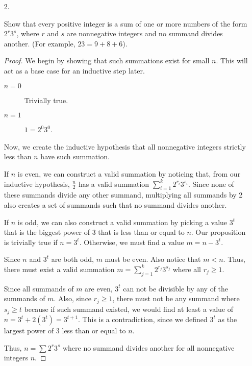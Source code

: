 \documentclass{article}
\begin{document}
\begin{enumerate}
    \item[2.] {
        Show that every positive integer is a sum of one or more numbers of the 
        form \(2^r3^s\), where \(r\) and \(s\) are nonnegative integers and no 
        summand divides another. (For example, \(23 = 9 + 8 + 6\)).

        \begin{proof}
            We begin by showing that such summations exist for small \(n\). This 
            will act as a base case for an inductive step later.

            \begin{description}
                \item[\(n=0\)] Trivially true.
                \item[\(n=1\)] \(1 = 2^0 3^0\).
            \end{description}

            Now, we create the inductive hypothesis that all nonnegative 
            integers strictly less than \(n\) have such summation.

            If \(n\) is even, we can construct a valid summation by noticing 
            that, from our inductive hypothesis, \(\frac{n}{2}\) has a valid summation 
            \(\sum_{i=1}^{k}2^{r_i}3^{s_i}\). Since none of these summands divide 
            any other summand, multiplying all summands by 2 also creates a set 
            of summands such that no summand divides another.

            If \(n\) is odd, we can also construct a valid summation by picking 
            a value \(3^t\) that is the biggest power of 3 that is less than or 
            equal to \(n\). Our proposition is trivially true if \(n = 3^t\). 
            Otherwise, we must find a value \(m = n - 3^t\).

            Since \(n\) and \(3^t\) are both odd, \(m\) must be even. Also notice 
            that \(m < n\). Thus, there must exist a valid summation
            \(m = \sum_{j=1}^{k}2^{r_j}3^{s_j}\) where all \(r_j \ge 1\).

            Since all summands of \(m\) are even, \(3^t\) can not be divisible 
            by any of the summands of \(m\). Also, since \(r_j \ge 1\), there 
            must not be any summand where \(s_j \ge t\) because if such summand 
            existed, we would find at least a value of 
            \(n = 3^t + 2(3^t) = 3^{t+1}\). This is a contradiction, since we 
            defined \(3^t\) as the largest power of 3 less than or equal to \(n\).

            Thus, \(n = \sum 2^r3^s\) where no summand divides another for all 
            nonnegative integers \(n\).
        \end{proof}
    }
\end{enumerate}
\end{document}

